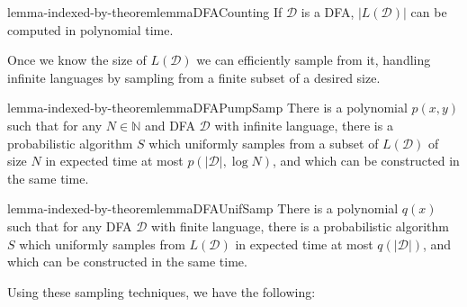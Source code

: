 \documentclass[a4paper,USenglish,numberwithinsect]{lipics}
\theoremstyle{plain}
\theoremstyle{definition}
\newcommand{\N}{\mathbb{N}}
\begin{document}
\begin{restatable}{lemma-indexed-by-theorem}{lemmaDFACounting} \label{lemma-dfa-counting}
If $\mathcal{D}$ is a DFA, $|L(\mathcal{D})|$ can be computed in polynomial time.
\end{restatable}

Once we know the size of $L(\mathcal{D})$ we can efficiently sample
from it, handling infinite languages by sampling from a finite subset
of a desired size. 

\begin{restatable}{lemma-indexed-by-theorem}{lemmaDFAPumpSamp} \label{lemma-dfa-pump-samp}
There is a polynomial $p(x,y)$ such that for any $N \in \N$ and DFA $\mathcal{D}$ with infinite language, there is a probabilistic algorithm $S$ which uniformly samples from a subset of $L(\mathcal{D})$ of size $N$ in expected time at most $p(|\mathcal{D}|, \log N)$, and which can be constructed in the same time.
\end{restatable}

\begin{restatable}{lemma-indexed-by-theorem}{lemmaDFAUnifSamp} \label{lemma-dfa-unif-samp}
There is a polynomial $q(x)$ such that for any DFA $\mathcal{D}$ with finite language, there is a probabilistic algorithm $S$ which uniformly samples from $L(\mathcal{D})$ in expected time at most $q(|\mathcal{D}|)$, and which can be constructed in the same time.
\end{restatable}

Using these sampling techniques, we have the following:
\end{document}
